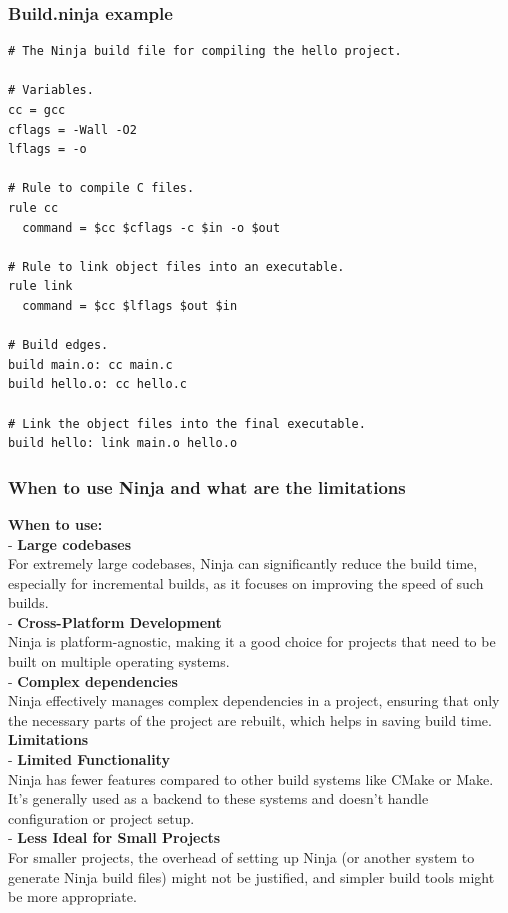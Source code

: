 \documentclass{beamer}
\begin{document}
\begin{frame}[fragile]
\frametitle{Build.ninja example}
\tiny
\begin{lstlisting}
# The Ninja build file for compiling the hello project.

# Variables.
cc = gcc
cflags = -Wall -O2
lflags = -o

# Rule to compile C files.
rule cc
  command = $cc $cflags -c $in -o $out

# Rule to link object files into an executable.
rule link
  command = $cc $lflags $out $in

# Build edges.
build main.o: cc main.c
build hello.o: cc hello.c

# Link the object files into the final executable.
build hello: link main.o hello.o

\end{lstlisting}
\end{frame}

\begin{frame}
\frametitle{When to use Ninja and what are the limitations}
\footnotesize
\textbf{When to use:}\\
- \textbf{Large codebases}\\
For extremely large codebases, Ninja can significantly reduce the build time, especially for incremental builds, as it focuses on improving the speed of such builds.\\
- \textbf{Cross-Platform Development} \\
Ninja is platform-agnostic, making it a good choice for projects that need to be built on multiple operating systems. \\
- \textbf{Complex dependencies} \\
 Ninja effectively manages complex dependencies in a project, ensuring that only the necessary parts of the project are rebuilt, which helps in saving build time.\\
\textbf{Limitations}\\
- \textbf{Limited Functionality} \\
Ninja has fewer features compared to other build systems like CMake or Make. It’s generally used as a backend to these systems and doesn’t handle configuration or project setup.\\
- \textbf{Less Ideal for Small Projects} \\
For smaller projects, the overhead of setting up Ninja (or another system to generate Ninja build files) might not be justified, and simpler build tools might be more appropriate.
\end{frame}
\end{document}
